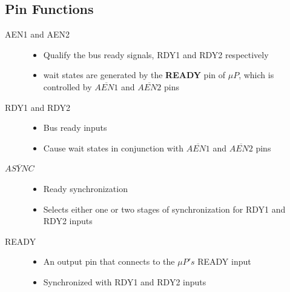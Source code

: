 \subsection{Pin Functions}
\begin{description}

  \item[AEN1 and AEN2]
  \begin{itemize}
    \item Qualify the bus ready signals, RDY1 and RDY2 respectively
    \item wait states are generated by the \textbf{READY} pin of $\mu P$, which is controlled
    by $\overline{AEN1}$ and $\overline{AEN2}$ pins
  \end{itemize}

  \item[RDY1 and RDY2]
  \begin{itemize}
    \item Bus ready inputs
    \item Cause wait states in conjunction with $\overline{AEN1}$ and $\overline{AEN2}$ pins
  \end{itemize}

  \item[$\overline{ASYNC}$]
  \begin{itemize}
    \item Ready synchronization
    \item Selects either one or two stages of synchronization for RDY1 and RDY2 inputs

  \end{itemize}

  \item[READY]
  \begin{itemize}
    \item An output pin that connects to the $\mu P's$ READY input
    \item Synchronized with RDY1 and RDY2 inputs
  \end{itemize}

\end{description}
